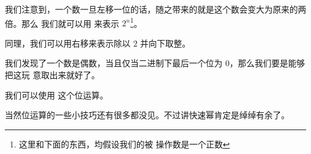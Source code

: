 \begin{frame}
我们注意到，一个数一旦左移一位的话，随之带来的就是这个数会变大为原来的两倍。那么
我们就可以用  来表示 $2^n$\footnote{这里和下面的东西，均假设我们的被
操作数是一个正数}。

同理，我们可以用右移来表示除以 $2$ 并向下取整。
\end{frame}

\begin{frame}
我们发现了一个数是偶数，当且仅当二进制下最后一个位为 $0$，那么我们要是能够把这玩
意取出来就好了。\pause

我们可以使用  这个位运算。
\end{frame}

\begin{frame}
当然位运算的一些小技巧还有很多都没见。不过讲快速幂肯定是绰绰有余了。
\end{frame}
